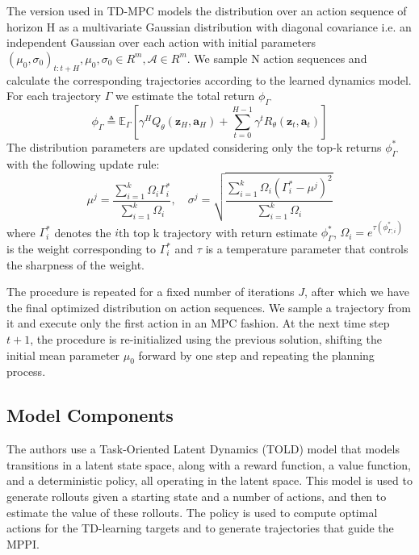 \documentclass{article}
\begin{document}
The version used in TD-MPC models the distribution over an action sequence of horizon H as a multivariate Gaussian distribution with diagonal covariance i.e. an independent Gaussian over each action with initial parameters $(\mu_0,\sigma_0)_{t:t+H}, \mu_0,\sigma_0\in R^m, \mathcal{A}\in R^m$. We sample N action sequences and calculate the corresponding trajectories according to the learned dynamics model. For each trajectory  $\Gamma$ we estimate the total return $\phi_\Gamma$
\begin{equation}
\phi_{\Gamma} \triangleq \mathbb{E}_{\Gamma} \left[ \gamma^{H}Q_{\theta}(\mathbf{z}_{H},\mathbf{a}_{H}) + \sum_{t=0}^{H-1}\gamma^{t}R_{\theta}(\mathbf{z}_{t},\mathbf{a}_{t}) \right]
\end{equation}
The distribution parameters are updated considering only the top-k returns $\phi_\Gamma^*$ with the following update rule: 
\begin{equation}
\mu^j = \frac{\sum_{i=1}^k \Omega_i \Gamma_i^*}{\sum_{i=1}^k \Omega_i}, \quad \sigma^j = \sqrt{\frac{\sum_{i=1}^k \Omega_i (\Gamma_i^* - \mu^j)^2}{\sum_{i=1}^k \Omega_i}}
\end{equation}
where $\Gamma^\ast_i$ denotes the $i$th top k trajectory with return estimate $\phi^\ast_\Gamma$, $\Omega_i=e^{\tau(\phi^\ast_{\Gamma,i})}$ is the weight corresponding to $\Gamma^\ast_i$ and $\tau$ is a temperature parameter that controls the sharpness of the weight.

The procedure is repeated for a fixed number of iterations $J$, after which we have the final optimized distribution on action sequences. We sample a trajectory from it and execute only the first action in an MPC fashion. At the next time step $t+1$, the procedure is re-initialized using the previous solution, shifting the initial mean parameter $\mu_0$ forward by one step and repeating the planning process.
\subsection{Model Components}
The authors use a Task-Oriented Latent Dynamics (TOLD) model that models transitions in a latent state space, along with a reward function, a value function, and a deterministic policy, all operating in the latent space. This model is used to generate rollouts given a starting state and a number of actions, and then to estimate the value of these rollouts. The policy is used to compute optimal actions for the TD-learning targets and to generate trajectories that guide the MPPI.
\end{document}
